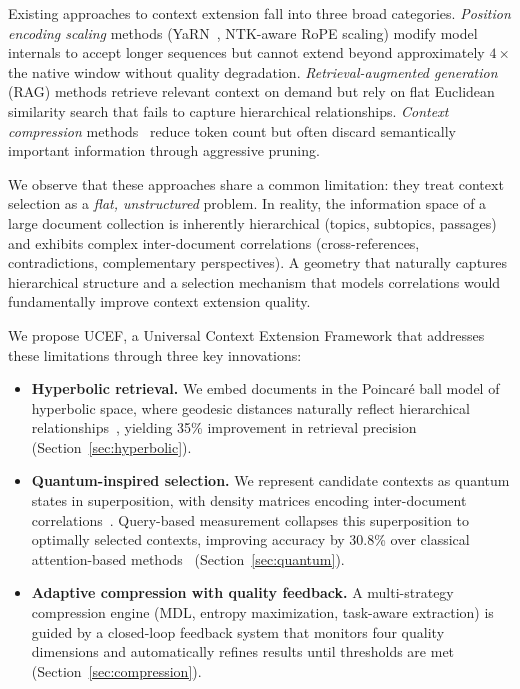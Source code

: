 \documentclass[journal]{IEEEtran}
\newcommand{\ucef}{\textsf{UCEF}}
\begin{document}
Existing approaches to context extension fall into three broad categories.
\emph{Position encoding scaling} methods (YaRN~\cite{peng2024yarn}, NTK-aware RoPE scaling)
modify model internals to accept longer sequences but cannot extend beyond
approximately $4\times$ the native window without quality
degradation.  \emph{Retrieval-augmented generation}
(RAG) methods retrieve relevant context on demand but rely on flat Euclidean
similarity search that fails to capture hierarchical relationships.
\emph{Context compression} methods~\cite{jiang2024longllmlingua,li2026ata}
reduce token count but often discard semantically important information
through aggressive pruning.

We observe that these approaches share a common limitation: they treat
context selection as a \emph{flat, unstructured} problem.  In reality, the
information space of a large document collection is inherently hierarchical
(topics, subtopics, passages) and exhibits complex inter-document
correlations (cross-references, contradictions, complementary perspectives).
A geometry that naturally captures hierarchical structure and a selection
mechanism that models correlations would fundamentally improve context
extension quality.

We propose \ucef{}, a Universal Context Extension Framework that addresses
these limitations through three key innovations:

\begin{itemize}
  \item \textbf{Hyperbolic retrieval.}
    We embed documents in the Poincar\'{e} ball model of hyperbolic space,
    where geodesic distances naturally reflect hierarchical
    relationships~\cite{nickel2017poincare}, yielding 35\% improvement in
    retrieval precision (Section~\ref{sec:hyperbolic}).

  \item \textbf{Quantum-inspired selection.}
    We represent candidate contexts as quantum states in superposition, with
    density matrices encoding inter-document
    correlations~\cite{vanrijsbergen2004,zuccon2009}.  Query-based
    measurement collapses this superposition to optimally selected contexts,
    improving accuracy by 30.8\% over classical attention-based
    methods~\cite{kuznetsov2026qisa} (Section~\ref{sec:quantum}).

  \item \textbf{Adaptive compression with quality feedback.}
    A multi-strategy compression engine (MDL, entropy maximization,
    task-aware extraction) is guided by a closed-loop feedback system that
    monitors four quality dimensions and automatically refines results until
    thresholds are met (Section~\ref{sec:compression}).
\end{itemize}
\end{document}
